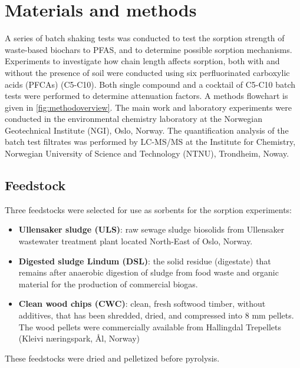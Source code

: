 \chapter{Materials and methods}\label{chap:MatlsMethds}
A series of batch shaking tests was conducted to test the sorption strength of waste-based biochars to PFAS, and to determine possible sorption mechanisms. Experiments to investigate how chain length affects sorption, both with and without the presence of soil were conducted using six perfluorinated carboxylic acids (PFCAs) (C5-C10). Both single compound and a cocktail of C5-C10 batch tests were performed to determine attenuation factors. A methods flowchart is given in \cref{fig:methodoverview}. The main work and laboratory experiments were conducted in the environmental chemistry laboratory at the Norwegian Geotechnical Institute (NGI), Oslo, Norway. The quantification analysis of the batch test filtrates was performed by LC-MS/MS at the Institute for Chemistry, Norwegian University of Science and Technology (NTNU), Trondheim, Noway.

\section{Feedstock}
Three feedstocks were selected for use as sorbents for the sorption experiments:

\begin{itemize}
    \item \textbf{Ullensaker sludge (ULS)}: raw sewage sludge biosolids from Ullensaker wastewater treatment plant located North-East of Oslo, Norway. 
    \item \textbf{Digested sludge Lindum (DSL)}: the solid residue (digestate) that remains after anaerobic digestion of sludge from food waste and organic material for the production of commercial biogas.
    \item \textbf{Clean wood chips (CWC)}: clean, fresh softwood timber, without additives, that has been shredded, dried, and compressed into 8 mm pellets. The wood pellets were commercially available from Hallingdal Trepellets (Kleivi næringspark, Ål, Norway)
\end{itemize}

These feedstocks were dried and pelletized before pyrolysis.

